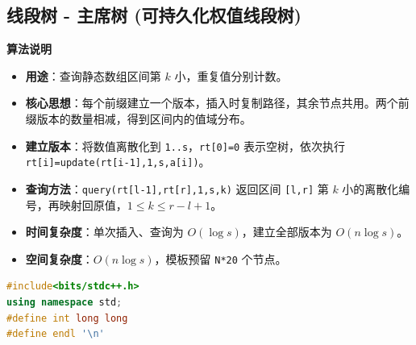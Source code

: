 \documentclass[10pt,landscape,a4paper]{article}
\begin{document}
\begin{multicols*}{3}
\subsection*{线段树 - 主席树 (可持久化权值线段树)}
\par\addvspace{0.7ex}\noindent\textbf{算法说明}\par\nobreak
\begin{itemize}
\item \textbf{用途}：查询静态数组区间第 $k$ 小，重复值分别计数。
\item \textbf{核心思想}：每个前缀建立一个版本，插入时复制路径，其余节点共用。两个前缀版本的数量相减，得到区间内的值域分布。
\item \textbf{建立版本}：将数值离散化到 \texttt{1\allowbreak{}.\allowbreak{}.\allowbreak{}s}，\texttt{r\allowbreak{}t\allowbreak{}[\allowbreak{}0\allowbreak{}]\allowbreak{}=\allowbreak{}0} 表示空树，依次执行 \texttt{r\allowbreak{}t\allowbreak{}[\allowbreak{}i\allowbreak{}]\allowbreak{}=\allowbreak{}u\allowbreak{}p\allowbreak{}d\allowbreak{}a\allowbreak{}t\allowbreak{}e\allowbreak{}(\allowbreak{}r\allowbreak{}t\allowbreak{}[\allowbreak{}i\allowbreak{}-\allowbreak{}1\allowbreak{}]\allowbreak{},\allowbreak{}1\allowbreak{},\allowbreak{}s\allowbreak{},\allowbreak{}a\allowbreak{}[\allowbreak{}i\allowbreak{}]\allowbreak{})}。
\item \textbf{查询方法}：\texttt{q\allowbreak{}u\allowbreak{}e\allowbreak{}r\allowbreak{}y\allowbreak{}(\allowbreak{}r\allowbreak{}t\allowbreak{}[\allowbreak{}l\allowbreak{}-\allowbreak{}1\allowbreak{}]\allowbreak{},\allowbreak{}r\allowbreak{}t\allowbreak{}[\allowbreak{}r\allowbreak{}]\allowbreak{},\allowbreak{}1\allowbreak{},\allowbreak{}s\allowbreak{},\allowbreak{}k\allowbreak{})} 返回区间 \texttt{[\allowbreak{}l\allowbreak{},\allowbreak{}r\allowbreak{}]} 第 $k$ 小的离散化编号，再映射回原值，$1\le k\le r-l+1$。
\item \textbf{时间复杂度}：单次插入、查询为 $O(\log s)$，建立全部版本为 $O(n\log s)$。
\item \textbf{空间复杂度}：$O(n\log s)$，模板预留 \texttt{N\allowbreak{}*\allowbreak{}2\allowbreak{}0} 个节点。
\end{itemize}
\par{}\par
\begin{lstlisting}[language=C++]
#include<bits/stdc++.h>
using namespace std;
#define int long long
#define endl '\n'


\end{lstlisting}
\end{multicols*}
\end{document}
